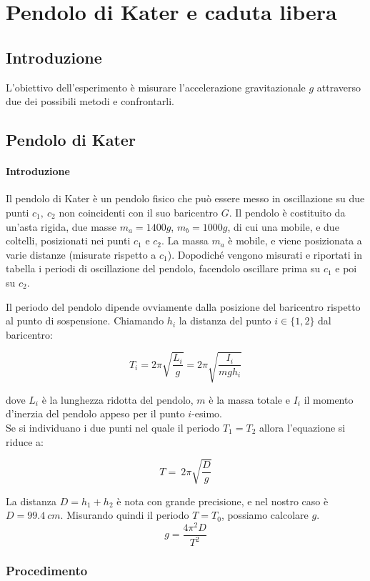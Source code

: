 \chapter{Pendolo di Kater e caduta libera}
\section{Introduzione}

L'obiettivo dell'esperimento è misurare l'accelerazione gravitazionale $g$ attraverso due dei possibili metodi e confrontarli. 

\section{Pendolo di Kater}
\subsubsection{Introduzione}

Il pendolo di Kater è un pendolo fisico che può essere messo in oscillazione su due punti $c_1,\ c_2$ non coincidenti con il suo baricentro $G$. Il pendolo è costituito da un'asta rigida, due masse $m_a = 1400g$, $m_b=1000g$, di cui una mobile, e due coltelli, posizionati nei punti $c_1$ e $c_2$. La massa $m_a$ è mobile, e viene posizionata a varie distanze (misurate rispetto a $c_1$). Dopodiché vengono misurati e riportati in tabella i periodi di oscillazione del pendolo, facendolo oscillare prima su $c_1$ e poi su $c_2$.

Il periodo del pendolo dipende ovviamente dalla posizione del baricentro rispetto al punto di sospensione. Chiamando $h_i$ la distanza del punto $i\in\{1,2\}$ dal baricentro:

$$ T_i = 2 \pi \sqrt{\frac{L_i}{g}} = 2 \pi \sqrt{\frac{I_i}{m gh_i}}$$

dove $L_i$ è la lunghezza ridotta del pendolo, $m$ è la massa totale e $I_i$ il momento d'inerzia del pendolo appeso per il punto $i$-esimo.
\\
Se si individuano i due punti nel quale il periodo $T_1 = T_2$ allora l'equazione si riduce a:

$$ T = \ 2 \pi \sqrt{\frac{D}{g}}$$

La distanza $D= h_1 + h_2 $  è nota con grande precisione, e nel nostro caso è $D=99.4\ cm$. Misurando quindi il periodo $T=T_0$, possiamo calcolare $g$.
$$ g = \frac{4\pi^2D}{T^2}$$
\subsection{Procedimento}

